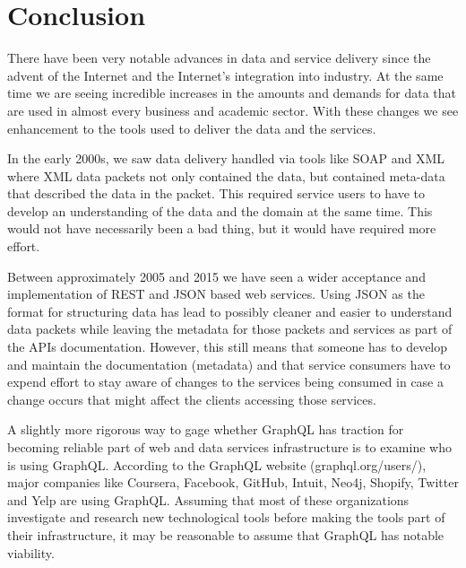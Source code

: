 \section{Conclusion}
There have been very notable advances in data and service delivery since the 
advent of the Internet and the Internet's integration into industry.  At the 
same time we are seeing incredible increases in the amounts and demands for 
data that are used in almost every business and academic sector.  With these 
changes we see enhancement to the tools used to deliver the data and the 
services.  

In the early 2000s, we saw data delivery handled via tools like SOAP and XML 
where XML data packets not only contained the data, but contained meta-data 
that described the data in the packet.  This required service users to have to 
develop an understanding of the data and the domain at the same time.  This 
would not have necessarily been a bad thing, but it would have required more 
effort.

Between approximately 2005 and 2015 we have seen a wider acceptance and 
implementation of REST and JSON based web services.  Using JSON as the format 
for structuring data has lead to possibly cleaner and easier to understand 
data packets while leaving the metadata for those packets and services as part 
of the APIs documentation.  However, this still means that someone has to 
develop and maintain the documentation (metadata) and that service consumers 
have to expend effort to stay aware of changes to the services being consumed 
in case a change occurs that might affect the clients accessing those services.

A slightly more rigorous way to gage whether GraphQL has traction for becoming 
reliable part of web and data services infrastructure is to examine who is 
using GraphQL.  According to the GraphQL website (graphql.org/users/), major 
companies like Coursera, Facebook, GitHub, Intuit, Neo4j, Shopify, Twitter 
and Yelp are using GraphQL\cite{GraphQLUsers2018}.  Assuming that most of these 
organizations investigate and research new technological tools before making 
the tools part of their infrastructure, it may be reasonable to assume that 
GraphQL has notable viability.

